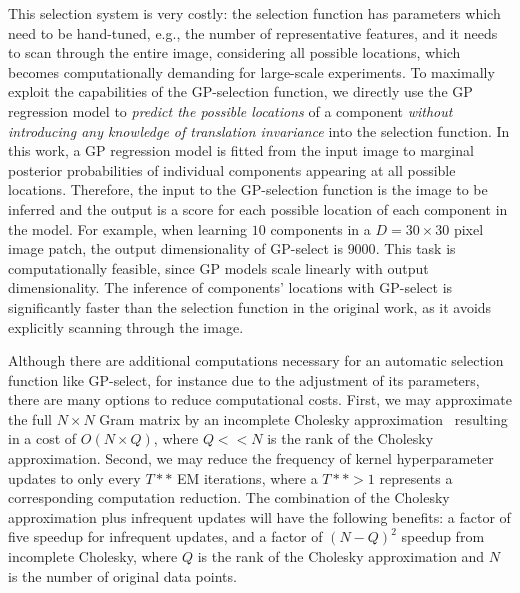 This selection system is very costly: the selection function has parameters which need to be hand-tuned, e.g., the number of representative features, and %
it needs to scan through the entire image, considering all possible locations, which becomes computationally demanding for large-scale experiments.
%
To maximally exploit the capabilities of the GP-selection function, we directly use the GP regression model to \textit{predict the possible locations} of a component \textit{without introducing any knowledge of translation invariance} into the selection function. In this work, a GP regression model is fitted from the input image to marginal posterior probabilities of individual components appearing at all possible locations. Therefore, the input to the GP-selection function is the image to be inferred and the output is a score for each possible location of each component in the model.
For example, when learning $10$ components in a $D=30\times 30$ pixel image patch, the output dimensionality of GP-select is $9000$.
This task is computationally feasible, since GP models scale linearly with output dimensionality.
The inference of components' locations with GP-select is significantly faster than the selection function in the original work, as it avoids explicitly scanning through the image.

Although there are additional computations necessary for an automatic selection function like GP-select, for instance due to the adjustment of its parameters,  %
there are many options to reduce computational costs. %
First, we may approximate the full $N \times N$ Gram matrix by an incomplete Cholesky approximation~\citep{FinSch01} 
resulting in a cost of $O(N\times Q)$, where $Q << N$ is the rank of the Cholesky approximation.
%
Second, we may reduce the frequency of kernel hyperparameter updates to only every $T\ast*$ EM iterations, where a $T\ast* > 1$ represents a corresponding computation reduction.
The combination of the Cholesky approximation plus infrequent updates will have the following benefits: a factor of five speedup for infrequent updates, and a factor of $(N-Q)^2$ speedup from incomplete Cholesky, where $Q$ is the rank of the Cholesky approximation and $N$ is the number of original data points. 

